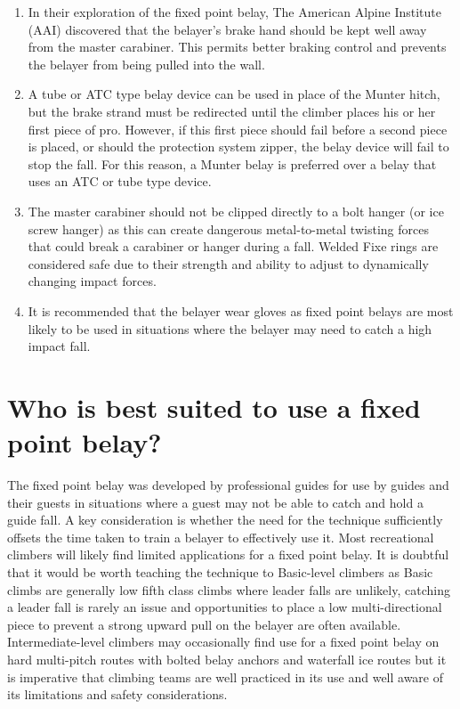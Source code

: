 \documentclass[nonacm,acmtog]{acmart}
\begin{document}
\begin{enumerate}
\item In their exploration of the fixed point belay, The American Alpine
Institute (AAI) discovered that the belayer’s brake hand should be kept well
away from the master carabiner. This permits better braking control and
prevents the belayer from being pulled into the wall.

\item  A tube or ATC type belay device can be used in place of the Munter
hitch, but the brake strand must be redirected until the climber places his or
her first piece of pro. However, if this first piece should fail before a
second piece is placed, or should the protection system zipper, the belay
device will fail to stop the fall.  For this reason, a Munter belay is
preferred over a belay that uses an ATC or tube type device.

\item The master carabiner should not be clipped directly to a bolt hanger (or
ice screw hanger) as this can create dangerous metal-to-metal twisting forces
that could break a carabiner or hanger during a fall.  Welded Fixe rings are
considered safe due to their strength and ability to adjust to dynamically
changing impact forces.

\item It is recommended that the belayer wear gloves as fixed point belays are
most likely to be used in situations where the belayer may need to catch a high
impact fall.
\end{enumerate}

\section{Who is best suited to use a fixed point belay?}
The fixed point belay was developed by professional guides for use by guides
and their guests in situations where a guest may not be able to catch and hold
a guide fall. A key consideration is whether the need for the technique
sufficiently offsets the time taken to train a belayer to effectively use it.
Most recreational climbers will likely find limited applications for a fixed
point belay. It is doubtful that it would be worth teaching the technique to
Basic-level climbers as Basic climbs are generally low fifth class climbs where
leader falls are unlikely, catching a leader fall is rarely an issue and
opportunities to place a low multi-directional piece to prevent a strong upward
pull on the belayer are often available. Intermediate-level climbers may
occasionally find use for a fixed point belay on hard multi-pitch routes with
bolted belay anchors and waterfall ice routes but it is imperative that
climbing teams are well practiced in its use and well aware of its limitations
and safety considerations.
\end{document}
